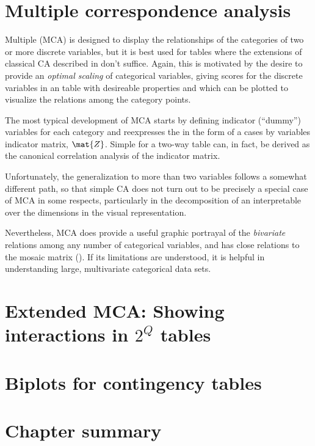 \documentclass[11pt]{book}\usepackage[]{graphicx}\usepackage[]{color}
\begin{document}
\section{Multiple correspondence analysis}\label{sec:mca}

Multiple \ca (MCA) is designed to display the relationships of the categories
of two or more discrete variables, but it is best used for \mway tables
where the extensions of classical CA described in 
don't suffice.
Again, this is motivated by the desire to provide 
an \emph{optimal scaling} of categorical variables, giving scores for the 
discrete variables in an \nway table with desireable properties and which
can be plotted to visualize the relations among the category points.

The most typical development of MCA
starts by defining indicator (``dummy'') variables
for each category and reexpresses the \nway \ctab in the form
of a cases by variables indicator matrix, $\mat{Z}$.
Simple \ca for a two-way table can, in fact, be derived as the
canonical correlation analysis of the indicator matrix.

Unfortunately, the generalization to more than two variables follows
a somewhat different path, so that simple CA does not turn out to be
precisely a special case of MCA in some respects, particularly in the
decomposition of an interpretable \chisq over the dimensions in
the visual representation.

Nevertheless, MCA does provide a useful graphic portrayal of the
\emph{bivariate} relations among any number of categorical variables,
and has close relations to the mosaic matrix ().
If its limitations are understood, it is helpful in
understanding large, multivariate categorical data sets.

\section{Extended MCA: Showing interactions in $2^Q$ tables}\label{sec:ca-mcainter}
\section{Biplots for contingency tables}\label{sec:biplot}
\section{Chapter summary}\label{sec:ca-summary}
\end{document}
